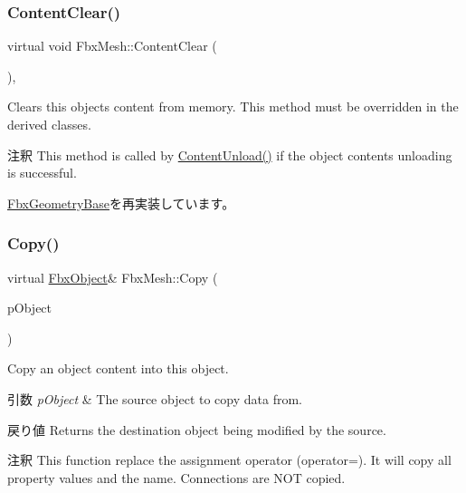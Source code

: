 \subsubsection{\texorpdfstring{Content\+Clear()}{ContentClear()}}
{\footnotesize\ttfamily virtual void Fbx\+Mesh\+::\+Content\+Clear (\begin{DoxyParamCaption}{ }\end{DoxyParamCaption})\hspace{0.3cm}{\ttfamily [protected]}, {\ttfamily [virtual]}}

Clears this object\textquotesingle{}s content from memory. This method must be overridden in the derived classes. \begin{DoxyRemark}{注釈}
This method is called by \hyperlink{class_fbx_object_ac28653a3c65e840498eebfb54276e483}{Content\+Unload()} if the object content\textquotesingle{}s unloading is successful. 
\end{DoxyRemark}


\hyperlink{class_fbx_geometry_base_acf13ddd2717d2f1ca4dc57b5ea0801b1}{Fbx\+Geometry\+Base}を再実装しています。

\mbox{\label{class_fbx_mesh_a0f041743536ee5ccbc9a086e3ef1c663}} 
\subsubsection{\texorpdfstring{Copy()}{Copy()}}
{\footnotesize\ttfamily virtual \hyperlink{class_fbx_object}{Fbx\+Object}\& Fbx\+Mesh\+::\+Copy (\begin{DoxyParamCaption}\item[{const \hyperlink{class_fbx_object}{Fbx\+Object} \&}]{p\+Object }\end{DoxyParamCaption})\hspace{0.3cm}{\ttfamily [virtual]}}

Copy an object content into this object. 
\begin{DoxyParams}{引数}
{\em p\+Object} & The source object to copy data from. \\
\hline
\end{DoxyParams}
\begin{DoxyReturn}{戻り値}
Returns the destination object being modified by the source. 
\end{DoxyReturn}
\begin{DoxyRemark}{注釈}
This function replace the assignment operator (operator=). It will copy all property values and the name. Connections are N\+OT copied. 
\end{DoxyRemark}


